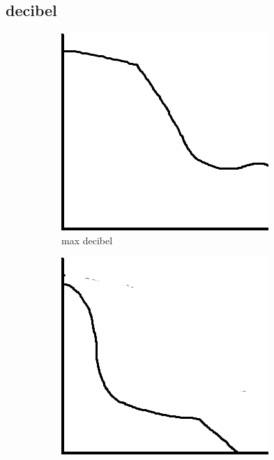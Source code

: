\subsection{decibel} 
\begin{figure}[hbt!] 
\begin{subfigure}{0.3\textwidth} 
\includegraphics[width=0.9\linewidth]{reports/current_report/images/max_graph_decibel.png}  
\caption{max decibel}  
\end{subfigure} 
\begin{subfigure}{0.3\textwidth} 
\includegraphics[width=0.9\linewidth]{reports/current_report/images/min_graph_decibel.png}  

\end{subfigure}
\end{figure}
